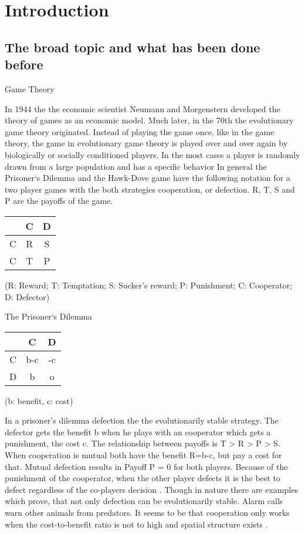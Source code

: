 \section{Introduction}

\subsection{The broad topic and what has been done before}

Game Theory

In 1944 the the economic scientist Neumann and Morgenstern developed the theory of games as an economic model. Much later, in the 70th the evolutionary game theory originated. Instead of playing the game once, like in the game theory, the game in evolutionary game theory is played over and over again by biologically or socially conditioned players. In the most cases a player is randomly drawn from a large population and has a specific behavior \citep{weibull1997}
In general the Prisoner`s Dilemma and the Hawk-Dove game have the following notation for a two player games with the both strategies cooperation, or defection. R, T, S and P are the payoffs of the game.

\begin{tabular}{|c|c|c|}
		\hline  & C & D \\ 
		\hline C & R & S \\ 
		\hline C & T & P \\ 
		\hline 
\end{tabular} 
(R: Reward; T: Temptation; S: Sucker's reward; P: Punishment; C: Cooperator; D: Defector)


The Prisoner`s Dilemma

\begin{tabular}{|c|c|c|}
	\hline  & C & D \\ 
	\hline C & b-c & -c \\ 
	\hline D & b & o \\ 
	\hline 
\end{tabular} 
(b: benefit, c: cost)

In a prisoner's dilemma defection the the evolutionarily stable strategy. The defector gets the benefit b when he plays with an cooperator which gets a punishment, the cost c. The relationship between payoffs is T > R > P > S. When cooperation is mutual both have the benefit R=b-c, but pay a cost for that. Mutual defection results in Payoff P = 0 for both players. Because of the punishment of the cooperator, when the other player defects it is the best to defect regardless of the co-players decision \citep{HauertandDoebeli2004}. Though in nature there are examples which prove, that not only defection can be evolutionarily stable. Alarm calls warn other animals from predators. It seems to be that cooperation only works when the cost-to-benefit ratio is not to high and spatial structure exists \citep{scot2001}.

